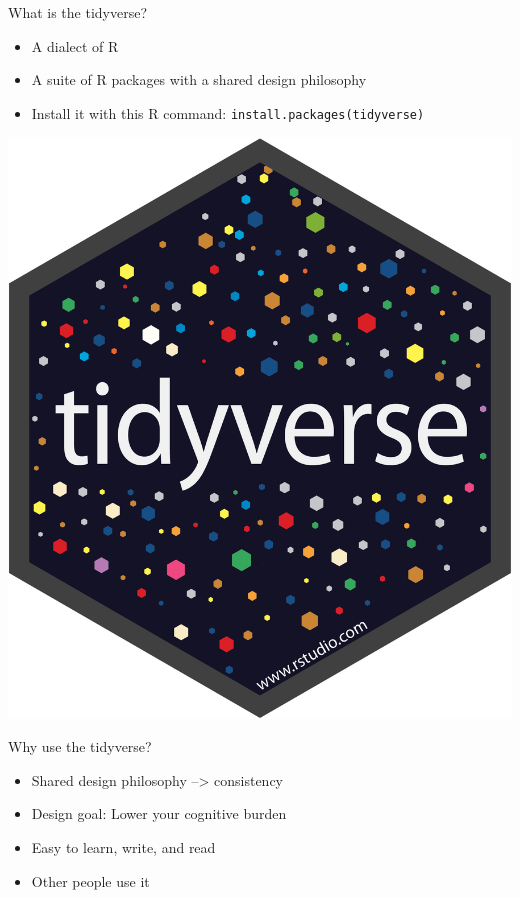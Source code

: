 \documentclass[
  ignorenonframetext,
]{beamer}
\providecommand{\tightlist}{%
  \setlength{\itemsep}{0pt}\setlength{\parskip}{0pt}}
\begin{document}
\begin{frame}[fragile]{What is the tidyverse?}
\protect\hypertarget{what-is-the-tidyverse}{}
\begin{itemize}
\item
  A dialect of R
\item
  A suite of R packages with a shared design philosophy
\item
  Install it with this R command:
  \texttt{install.packages(\textquotesingle{}tidyverse\textquotesingle{})}
\end{itemize}

\includegraphics[width=0.95\linewidth,height=0.95\textheight]{images/tidyverse-logo}
\end{frame}

\begin{frame}{Why use the tidyverse?}
\protect\hypertarget{why-use-the-tidyverse}{}
\begin{itemize}
\tightlist
\item
  Shared design philosophy --\textgreater{} consistency
\item
  Design goal: Lower your cognitive burden
\item
  Easy to learn, write, and read
\item
  Other people use it
\end{itemize}
\end{frame}
\end{document}
